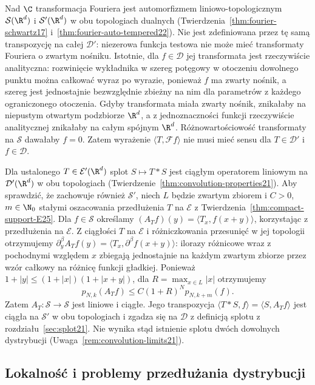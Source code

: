 \begin{uwaga}
\label{rem:fourier-conv25}
Nad $\C$ transformacja Fouriera jest automorfizmem
liniowo-topologicznym $\mathcal S(\R^d)$ i
$\mathcal S'(\R^d)$ w obu topologiach dualnych
(Twierdzenia~\ref{thm:fourier-schwartz17}
i~\ref{thm:fourier-auto-tempered22}).
Nie jest zdefiniowana przez tę samą transpozycję
na całej $\mathcal D'$: niezerowa funkcja testowa
nie może mieć transformaty Fouriera o zwartym nośniku.
Istotnie, dla $f\in\mathcal D$ jej transformata
jest rzeczywiście analityczna: rozwinięcie wykładnika
w szereg potęgowy w otoczeniu dowolnego punktu
można całkować wyraz po wyrazie, ponieważ $f$ ma
zwarty nośnik, a szereg jest jednostajnie bezwzględnie
zbieżny na nim dla parametrów z każdego ograniczonego
otoczenia. Gdyby transformata miała zwarty nośnik,
znikałaby na niepustym otwartym podzbiorze $\R^d$,
a z jednoznaczności funkcji rzeczywiście analitycznej
znikałaby na całym spójnym $\R^d$.
Różnowartościowość transformaty na $\mathcal S$
dawałaby $f=0$. Zatem wyrażenie
$\langle T,\mathcal F f\rangle$ nie musi mieć sensu
dla $T\in\mathcal D'$ i $f\in\mathcal D$.

Dla ustalonego $T\in\mathcal E'(\R^d)$ splot
$S\mapsto T*S$ jest ciągłym operatorem liniowym
na $\mathcal D'(\R^d)$ w obu topologiach
(Twierdzenie~\ref{thm:convolution-properties21}).
Aby sprawdzić, że zachowuje również $\mathcal S'$,
niech $L$ będzie zwartym zbiorem i $C>0$, $m\in\N_0$
stałymi oszacowania przedłużenia $T$ na $\mathcal E$
z Twierdzenia~\ref{thm:compact-support-E25}.
Dla $f\in\mathcal S$ określamy
$(A_Tf)(y)=\langle T_x,f(x+y)\rangle$,
korzystając z przedłużenia na $\mathcal E$.
Z ciągłości $T$ na $\mathcal E$ i różniczkowania
przesunięć w jej topologii otrzymujemy
$\partial_y^\beta A_T f(y)=
\langle T_x,\partial^\beta f(x+y)\rangle$:
ilorazy różnicowe wraz z pochodnymi względem $x$
zbiegają jednostajnie na każdym zwartym zbiorze
przez wzór całkowy na różnicę funkcji gładkiej.
Ponieważ $1+|y|\le(1+|x|)(1+|x+y|)$, dla
$R=\max_{x\in L}|x|$ otrzymujemy
\[
 p_{N,k}(A_Tf)\le C(1+R)^N p_{N,k+m}(f).
\]
Zatem $A_T:\mathcal S\to\mathcal S$ jest liniowe
i ciągłe. Jego transpozycja
$\langle T*S,f\rangle=\langle S,A_Tf\rangle$
jest ciągła na $\mathcal S'$ w obu topologiach
i zgadza się na $\mathcal D$ z definicją splotu
z rozdziału~\ref{sec:splot21}.
Nie wynika stąd istnienie splotu dwóch dowolnych
dystrybucji (Uwaga~\ref{rem:convolution-limits21}).
\end{uwaga}

\subsection{Lokalność i problemy przedłużania dystrybucji}

